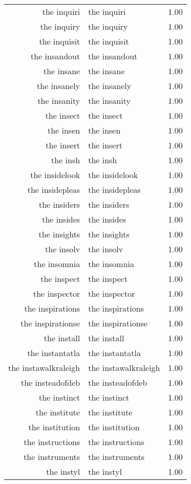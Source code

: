 \begin{table}[ht]
\begin{tabular}{rlr}
  the inquiri & the inquiri & 1.00 \\ 
  the inquiry & the inquiry & 1.00 \\ 
  the inquisit & the inquisit & 1.00 \\ 
  the insandout & the insandout & 1.00 \\ 
  the insane & the insane & 1.00 \\ 
  the insanely & the insanely & 1.00 \\ 
  the insanity & the insanity & 1.00 \\ 
  the insect & the insect & 1.00 \\ 
  the insen & the insen & 1.00 \\ 
  the insert & the insert & 1.00 \\ 
  the insh & the insh & 1.00 \\ 
  the insidelook & the insidelook & 1.00 \\ 
  the insidepleas & the insidepleas & 1.00 \\ 
  the insiders & the insiders & 1.00 \\ 
  the insides & the insides & 1.00 \\ 
  the insights & the insights & 1.00 \\ 
  the insolv & the insolv & 1.00 \\ 
  the insomnia & the insomnia & 1.00 \\ 
  the inspect & the inspect & 1.00 \\ 
  the inspector & the inspector & 1.00 \\ 
  the inspirations & the inspirations & 1.00 \\ 
  the inspirationse & the inspirationse & 1.00 \\ 
  the install & the install & 1.00 \\ 
  the instantatla & the instantatla & 1.00 \\ 
  the instawalkraleigh & the instawalkraleigh & 1.00 \\ 
  the insteadofdeb & the insteadofdeb & 1.00 \\ 
  the instinct & the instinct & 1.00 \\ 
  the institute & the institute & 1.00 \\ 
  the institution & the institution & 1.00 \\ 
  the instructions & the instructions & 1.00 \\ 
  the instruments & the instruments & 1.00 \\ 
  the instyl & the instyl & 1.00 \\ 

\end{tabular}
\end{table}
